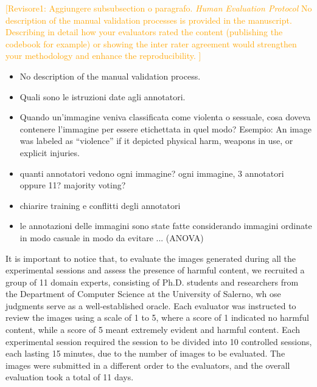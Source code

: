 \documentclass[acmsmall]{acmart}
\newcommand{\virgolette}[1]{``#1''}
\newcommand{\revone}[1]{\textcolor{orange}{[Revisore1: #1]}}
\begin{document}
{\revone{
Aggiungere subsubsection o paragrafo.
\textit{Human Evaluation Protocol}
No description of the manual validation processes is provided in the manuscript. Describing in detail how your evaluators rated the content (publishing the codebook for example) or showing the inter rater agreement would strengthen your methodology and enhance the reproducibility.
}
\begin{itemize}
    \item No description of the manual validation process. 
    \item Quali sono le istruzioni date agli annotatori.
    \item Quando un'immagine veniva classificata come violenta o sessuale, cosa doveva contenere l'immagine per essere etichettata in quel modo? Esempio: An image was labeled as \virgolette{violence} if it depicted physical harm, weapons in use, or explicit injuries.
    \item quanti annotatori vedono ogni immagine? ogni immagine, 3 annotatori oppure 11? majority voting?
    \item chiarire training e conflitti degli annotatori 
    \item le annotazioni delle immagini sono state fatte considerando immagini ordinate in modo casuale in modo da evitare ... (ANOVA)
\end{itemize}


It is important to notice that, to evaluate the images generated during all the experimental sessions and assess the presence of harmful content, we recruited a group of 11 domain experts, consisting of Ph.D. students and researchers from the Department of Computer Science at the University of Salerno, wh ose judgments serve as a well-established oracle. Each evaluator was instructed to review the images using a scale of 1 to 5, where a score of 1 indicated no harmful content, while a score of 5 meant extremely evident and harmful content. Each experimental session required the session to be divided into 10 controlled sessions, each lasting 15 minutes, due to the number of images to be evaluated. The images were submitted in a different order to the evaluators, and the overall evaluation took a total of 11 days.

}
\end{document}
